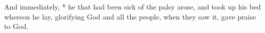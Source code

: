 And immediately, * he that had been sick of the palsy arose, and took up his bed whereon he lay, glorifying God and all the people, when they saw it, gave praise to God.
